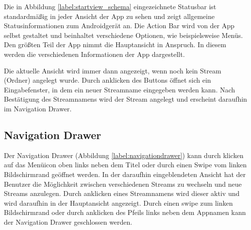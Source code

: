 Die in Abbildung \ref{label:startview_schema} eingezeichnete Statusbar ist standardmäßig in jeder Ansicht der App zu sehen und zeigt allgemeine Statusinformationen zum Androidgerät an. Die Action Bar wird von der App selbst gestaltet und beinhaltet verschiedene Optionen, wie beispielsweise Menüs. Den größten Teil der App nimmt die Hauptansicht in Anspruch. In diesem werden die verschiedenen Informationen der App dargestellt. 

Die aktuelle Ansicht wird immer dann angezeigt, wenn noch kein Stream (Ordner) angelegt wurde. Durch anklicken des Buttons öffnet sich ein Eingabefenster, in dem ein neuer Streamname eingegeben werden kann. Nach Bestätigung des Streamnamens wird der Stream angelegt und erscheint daraufhin im Navigation Drawer. 

\subsection{Navigation Drawer}

Der Navigation Drawer (Abbildung \ref{label:navigationdrawer}) kann durch klicken auf das Menüicon oben links neben dem Titel oder durch einen Swipe vom linken Bildschirmrand geöffnet werden.
In der daraufhin eingeblendeten Ansicht hat der Benutzer die Möglichkeit zwischen verschiedenen Streams zu wechseln und neue Streams anzulegen. Durch anklicken eines Streamnamens wird dieser aktiv und wird daraufhin in der Hauptansicht angezeigt. Durch einen swipe zum linken Bildschirmrand oder durch anklicken des Pfeils links neben dem Appnamen kann der Navigation Drawer geschlossen werden.

